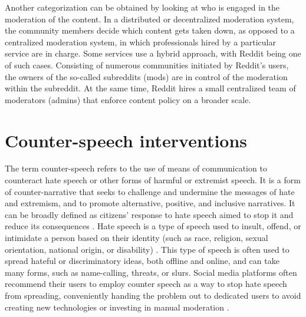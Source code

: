 \documentclass[preprint,12pt]{elsarticle}
\begin{document}
Another categorization can be obtained by looking at who is engaged in the moderation of the content. In a distributed or decentralized moderation system, the community members decide which content gets taken down, as opposed to a centralized moderation system, in which professionals hired by a particular service are in charge. Some services use a hybrid approach, with Reddit being one of such cases. Consisting of numerous communities initiated by Reddit's users, the owners of the so-called subreddits (mods) are in control of the moderation within the subreddit. At the same time, Reddit hires a small centralized team of moderators (admins) that enforce content policy on a broader scale. 






























\section{Counter-speech interventions}\label{sec:counter-speech}

The term counter-speech refers to the use of means of communication to counteract hate speech or other forms of harmful or extremist speech. It is a form of counter-narrative that seeks to challenge and undermine the messages of hate and extremism, and to promote alternative, positive, and inclusive narratives. It can be broadly defined as citizens’ response to hate speech aimed to stop it and reduce its consequences \citep{leader2016dangerous, garland2020countering}. Hate speech is a type of speech used to insult, offend, or intimidate a person based on their identity (such as race, religion, sexual orientation, national origin, or disability) \citep{dictionary2002merriam}. This type of speech is often used to spread hateful or discriminatory ideas, both offline and online, and can take many forms, such as name-calling, threats, or slurs. Social media platforms often recommend their users to employ counter speech as a way to stop hate speech from spreading, conveniently handing the problem out to dedicated users to avoid creating new technologies or investing in manual moderation \citep{schieb2016governing}.
\end{document}
